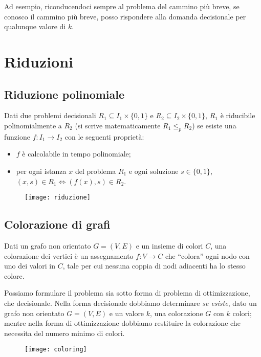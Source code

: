 Ad esempio, riconducendoci sempre al problema del cammino più breve, se conosco il cammino più breve, posso rispondere alla domanda decisionale per qualunque valore di \(k\).

\section{Riduzioni}

\subsection{Riduzione polinomiale}

Dati due problemi decisionali \(R_1 \subseteq I_1 \times \{0,1\}\) e \(R_2 \subseteq I_2 \times \{0,1\}\), \(R_1\) è riducibile polinomialmente a \(R_2\) (si scrive matematicamente \(R_1 \leqslant_p R_2\)) se esiste una funzione \(f: I_1 \to I_2\) con le seguenti proprietà:
\begin{itemize}
    \item \(f\) è calcolabile in tempo polinomiale;
    \item per ogni istanza \(x\) del problema \(R_1\) e ogni soluzione \(s \in \{0,1\}\), \((x,s) \in R_1 \Leftrightarrow (f(x), s) \in R_2\).
\end{itemize}

\begin{figure}[H]\centering
	\texttt{[image: riduzione]}
\end{figure}

\begin{minipage}[c]{.7\textwidth}
\subsection{Colorazione di grafi}

Dati un grafo non orientato \(G = (V,E)\) e un insieme di colori \(C\), una colorazione dei vertici è un assegnamento \(f: V \to C\) che \enquote{colora} ogni nodo con uno dei valori in \(C\), tale per cui nessuna coppia di nodi adiacenti ha lo stesso colore.

Possiamo formulare il problema sia sotto forma di problema di ottimizzazione, che decisionale.
Nella forma decisionale dobbiamo determinare \emph{se esiste}, dato un grafo non orientato \(G = (V,E)\) e un valore \(k\), una colorazione \(G\) con \(k\) colori; mentre nella forma di ottimizzazione dobbiamo restituire la colorazione che necessita del numero minimo di colori.
\end{minipage}%
\begin{minipage}[c]{.3\textwidth}
\begin{figure}[H]\centering
	\texttt{[image: coloring]}
\end{figure}
\end{minipage}

